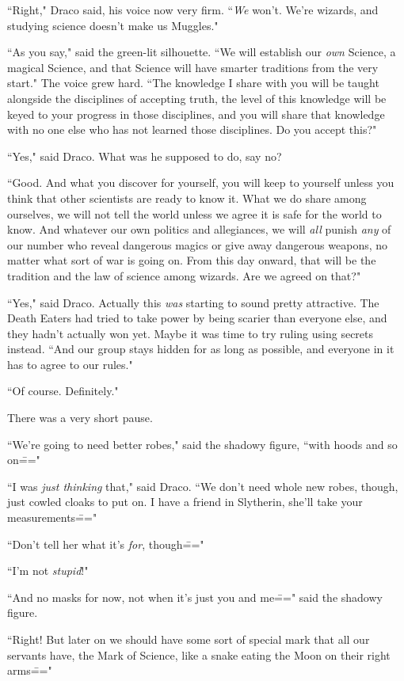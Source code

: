 ``Right," Draco said, his voice now very firm. ``\emph{We} won't. We're wizards, and studying science doesn't make us Muggles."

``As you say," said the green-lit silhouette. ``We will establish our \emph{own} Science, a magical Science, and that Science will have smarter traditions from the very start." The voice grew hard. ``The knowledge I share with you will be taught alongside the disciplines of accepting truth, the level of this knowledge will be keyed to your progress in those disciplines, and you will share that knowledge with no one else who has not learned those disciplines. Do you accept this?"

``Yes," said Draco. What was he supposed to do, say no?

``Good. And what you discover for yourself, you will keep to yourself unless you think that other scientists are ready to know it. What we do share among ourselves, we will not tell the world unless we agree it is safe for the world to know. And whatever our own politics and allegiances, we will \emph{all} punish \emph{any} of our number who reveal dangerous magics or give away dangerous weapons, no matter what sort of war is going on. From this day onward, that will be the tradition and the law of science among wizards. Are we agreed on that?"

``Yes," said Draco. Actually this \emph{was} starting to sound pretty attractive. The Death Eaters had tried to take power by being scarier than everyone else, and they hadn't actually won yet. Maybe it was time to try ruling using secrets instead. ``And our group stays hidden for as long as possible, and everyone in it has to agree to our rules."

``Of course. Definitely."

There was a very short pause.

``We're going to need better robes," said the shadowy figure, ``with hoods and so on\==="

``I was \emph{just thinking} that," said Draco. ``We don't need whole new robes, though, just cowled cloaks to put on. I have a friend in Slytherin, she'll take your measurements\==="

``Don't tell her what it's \emph{for}, though\==="

``I'm not \emph{stupid}!"

``And no masks for now, not when it's just you and me\===" said the shadowy figure.

``Right! But later on we should have some sort of special mark that all our servants have, the Mark of Science, like a snake eating the Moon on their right arms\==="

